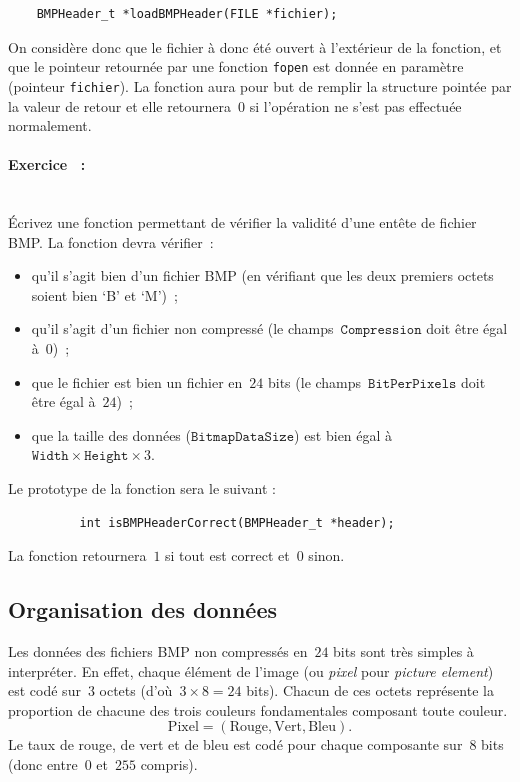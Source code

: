 \documentclass[a4paper]{article}
\newcounter{exerc}
\newcommand{\exercice}{\stepcounter{exerc}
  \setcounter{quest}{0}
  \paragraph{\large \bf Exercice \theexerc~:}}
\newcounter{quest}
\begin{document}
\begin{verbatim}
    BMPHeader_t *loadBMPHeader(FILE *fichier);
\end{verbatim}

On consid\`ere donc que le fichier \`a donc \'et\'e ouvert \`a
l'ext\'erieur de la fonction, et que le pointeur retourn\'ee par une
fonction \verb|fopen| est donn\'ee en param\`etre (pointeur
\verb|fichier|). La fonction aura pour but de remplir la structure
point\'ee par la valeur de retour et elle retournera~$0$ si
l'op\'eration ne s'est pas effectu\'ee normalement.

\exercice\ \\
\'Ecrivez une fonction permettant de v\'erifier la validit\'e d'une ent\^ete
de fichier BMP\@. La fonction devra v\'erifier~:
\begin{itemize}
\item qu'il s'agit bien d'un fichier BMP (en v\'erifiant que les deux
  premiers octets soient bien `B' et `M')~;
\item qu'il s'agit d'un fichier non compress\'e (le
  champs~$\mathtt{Compression}$ doit \^etre \'egal \`a~$0$)~;
\item que le fichier est bien un fichier en~$24$ bits (le
  champs~$\mathtt{BitPerPixels}$ doit \^etre \'egal \`a~$24$)~;
\item que la taille des donn\'ees ($\mathtt{BitmapDataSize}$) est bien
  \'egal \`a~${\mathtt{Width} \times \mathtt{Height} \times 3}$.
\end{itemize}

Le prototype de la fonction sera le suivant :
\begin{verbatim}
          int isBMPHeaderCorrect(BMPHeader_t *header);
\end{verbatim}

La fonction retournera~$1$ si tout est correct et~$0$ sinon.


\subsection{Organisation des donn\'ees}

Les donn\'ees des fichiers BMP non compress\'es en~$24$ bits sont
tr\`es simples \`a interpr\'eter. En effet, chaque \'el\'ement de
l'image (ou \emph{pixel} pour \emph{picture element}) est cod\'e
sur~$3$ octets (d'o\`u~${3\times8 = 24}$ bits). Chacun de ces octets
repr\'esente la proportion de chacune des trois couleurs fondamentales
composant toute couleur.
$$
\mathrm{Pixel} = (\mathrm{Rouge}, \mathrm{Vert}, \mathrm{Bleu}).
$$
Le taux de rouge, de vert et de bleu est cod\'e pour chaque composante
sur~$8$ bits (donc entre~$0$ et~$255$ compris).
\end{document}
